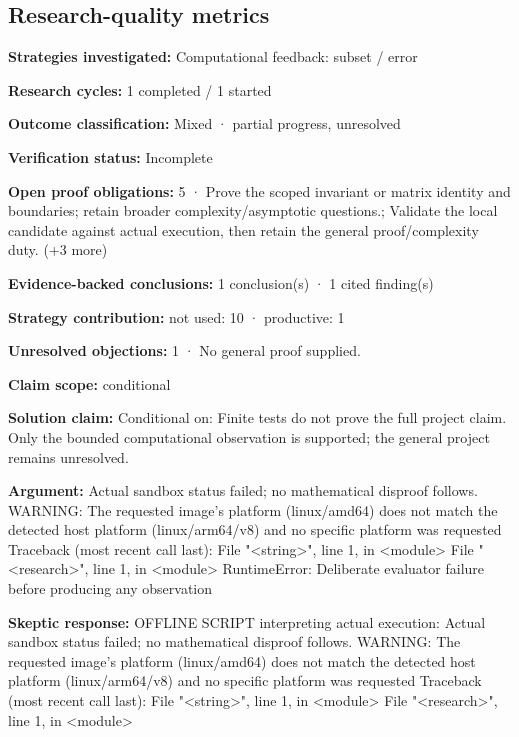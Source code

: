 \documentclass[11pt]{article}
\begin{document}
\subsection{Research-quality metrics}
\textbf{Strategies investigated:} Computational feedback: subset / error\par
\textbf{Research cycles:} 1 completed / 1 started\par
\textbf{Outcome classification:} Mixed · partial progress, unresolved\par
\textbf{Verification status:} Incomplete\par
\textbf{Open proof obligations:} 5 · Prove the scoped invariant or matrix identity and boundaries; retain broader complexity/asymptotic questions.; Validate the local candidate against actual execution, then retain the general proof/complexity duty. (+3 more)\par
\textbf{Evidence-backed conclusions:} 1 conclusion(s) · 1 cited finding(s)\par
\textbf{Strategy contribution:} not used: 10 · productive: 1\par
\textbf{Unresolved objections:} 1 · No general proof supplied.\par
\textbf{Claim scope:} conditional\par
\textbf{Solution claim:} Conditional on: Finite tests do not prove the full project claim. Only the bounded computational observation is supported; the general project remains unresolved.\par
\textbf{Argument:} Actual sandbox status failed; no mathematical disproof follows. WARNING: The requested image's platform (linux/amd64) does not match the detected host platform (linux/arm64/v8) and no specific platform was requested
Traceback (most recent call last):
  File "\textless{}string\textgreater{}", line 1, in \textless{}module\textgreater{}
  File "\textless{}research\textgreater{}", line 1, in \textless{}module\textgreater{}
RuntimeError: Deliberate evaluator failure before producing any observation\par
\textbf{Skeptic response:} OFFLINE SCRIPT interpreting actual execution: Actual sandbox status failed; no mathematical disproof follows. WARNING: The requested image's platform (linux/amd64) does not match the detected host platform (linux/arm64/v8) and no specific platform was requested
Traceback (most recent call last):
  File "\textless{}string\textgreater{}", line 1, in \textless{}module\textgreater{}
  File "\textless{}research\textgreater{}", line 1, in \textless{}module\textgreater{}
\end{document}
